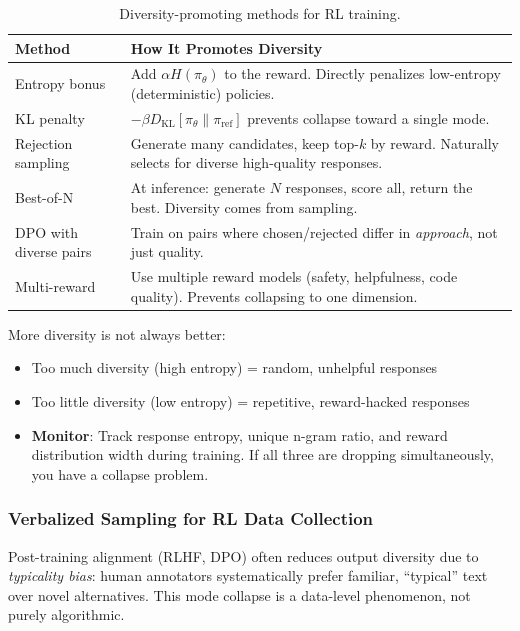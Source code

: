 \begin{table}[ht!]
\centering
\caption{Diversity-promoting methods for RL training.}
\begin{tabular}{@{}lp{11cm}@{}}
\toprule
\textbf{Method} & \textbf{How It Promotes Diversity} \\
\midrule
Entropy bonus & Add $\alpha H(\pi_\theta)$ to the reward. Directly penalizes low-entropy (deterministic) policies. \\
KL penalty & $-\beta D_\text{KL}[\pi_\theta \| \pi_\text{ref}]$ prevents collapse toward a single mode. \\
Rejection sampling & Generate many candidates, keep top-$k$ by reward. Naturally selects for diverse high-quality responses. \\
Best-of-N & At inference: generate $N$ responses, score all, return the best. Diversity comes from sampling. \\
DPO with diverse pairs & Train on pairs where chosen/rejected differ in \emph{approach}, not just quality. \\
Multi-reward & Use multiple reward models (safety, helpfulness, code quality). Prevents collapsing to one dimension. \\
\bottomrule
\end{tabular}
\end{table}

\begin{warningbox}
More diversity is not always better:

\begin{itemize}
  \item Too much diversity (high entropy) = random, unhelpful responses
  \item Too little diversity (low entropy) = repetitive, reward-hacked responses
  \item \textbf{Monitor}: Track response entropy, unique n-gram ratio, and reward distribution width during training. If all three are dropping simultaneously, you have a collapse problem.
\end{itemize}
\end{warningbox}

\subsubsection{Verbalized Sampling for RL Data Collection}
\label{verbalized-sampling-for-rl-data-collection}

Post-training alignment (RLHF, DPO) often reduces output diversity due to \emph{typicality bias}: human annotators systematically prefer familiar, ``typical'' text over novel alternatives. This mode collapse is a data-level phenomenon, not purely algorithmic.

